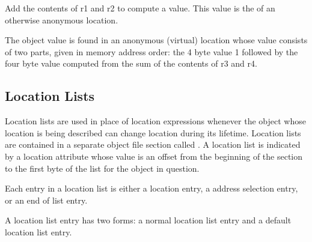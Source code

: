 \begin{description}
Add the contents of r1 and r2 to compute a value. This value is the
 of an otherwise anonymous location.

\vspace{-0.1\parsep}
The object value is found in an anonymous (virtual) location whose
value consists of two parts, given in memory address order: the 4 byte
value 1 followed by the four byte value computed from the sum of the
contents of r3 and r4.
\end{description}


\subsection{Location Lists}
\label{chap:locationlists}
Location lists 
are used in place of location expressions
whenever the object whose location is being described
can change location during its lifetime. 
Location lists
are contained in a separate object file section called
\dotdebugloc{}. A location list is indicated by a location
attribute whose value is an offset from the beginning of
the \dotdebugloc{} section to the first byte of the list for the
object in question.

Each entry in a location list is either a location 
entry,
a 
address selection entry, 
or an 
end of list entry.

A location list entry has two forms:
a normal location list entry and a default location list entry.

